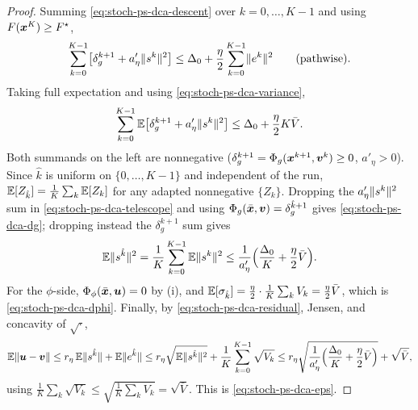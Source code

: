 \begin{proof}
Summing \eqref{eq:stoch-ps-dca-descent} over $k=0,\dots,K-1$ and using
$F(\bm{x}^K)\ge F^\star$,
\[
    \sum_{k=0}^{K-1}
    \bigl[\delta_g^{k+1}+a'_\eta\lVert s^k\rVert^2\bigr]
    \le
    \Delta_0+\frac\eta2\sum_{k=0}^{K-1}\lVert e^k\rVert^2
    \qquad\text{(pathwise).}
\]
Taking full expectation and using \eqref{eq:stoch-ps-dca-variance},
\begin{equation}
    \sum_{k=0}^{K-1}
    \mathbb{E}\bigl[\delta_g^{k+1}+a'_\eta\lVert s^k\rVert^2\bigr]
    \le
    \Delta_0+\frac\eta2 K\bar V .
    \label{eq:stoch-ps-dca-telescope}
\end{equation}
Both summands on the left are nonnegative
($\delta_g^{k+1}=\Phi_g(\bm{x}^{k+1},\bm{v}^k)\ge0$, $a'_\eta>0$). Since
$\hat k$ is uniform on $\{0,\dots,K-1\}$ and independent of the run,
$\mathbb{E}[Z_{\hat k}]=\tfrac1K\sum_{k}\mathbb{E}[Z_k]$ for any adapted
nonnegative $\{Z_k\}$. Dropping the $a'_\eta\lVert s^k\rVert^2$ sum in
\eqref{eq:stoch-ps-dca-telescope} and using
$\Phi_g(\bar{\bm{x}},\bm{v})=\delta_g^{\hat k+1}$ gives
\eqref{eq:stoch-ps-dca-dg}; dropping instead the $\delta_g^{k+1}$ sum
gives
\[
    \mathbb{E}\lVert s^{\hat k}\rVert^2
    =\frac1K\sum_{k=0}^{K-1}\mathbb{E}\lVert s^k\rVert^2
    \le
    \frac1{a'_\eta}
    \Bigl(\frac{\Delta_0}K+\frac\eta2\bar V\Bigr).
\]
For the $\phi$-side, $\Phi_\phi(\bar{\bm{x}},\bm{u})=0$ by
(i), and
$\mathbb{E}[\sigma_{\hat k}]=\tfrac\eta2\cdot\tfrac1K\sum_k V_k
=\tfrac\eta2\bar V$, which is \eqref{eq:stoch-ps-dca-dphi}. Finally, by
\eqref{eq:stoch-ps-dca-residual}, Jensen, and concavity of $\sqrt{\cdot}$,
\[
    \mathbb{E}\lVert \bm{u}-\bm{v}\rVert
    \le
    r_\eta\,\mathbb{E}\lVert s^{\hat k}\rVert+\mathbb{E}\lVert e^{\hat k}\rVert
    \le
    r_\eta\sqrt{\mathbb{E}\lVert s^{\hat k}\rVert^2}
    +\frac1K\sum_{k=0}^{K-1}\sqrt{V_k}
    \le
    r_\eta\sqrt{\frac1{a'_\eta}\Bigl(\frac{\Delta_0}K+\frac\eta2\bar V\Bigr)}
    +\sqrt{\bar V},
\]
using $\tfrac1K\sum_k\sqrt{V_k}\le\sqrt{\tfrac1K\sum_k V_k}=\sqrt{\bar
V}$. This is \eqref{eq:stoch-ps-dca-eps}.
\end{proof}

